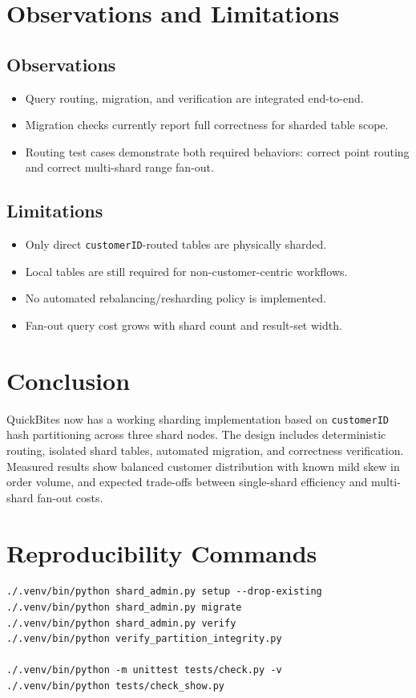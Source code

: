 \documentclass[12pt,a4paper]{article}
\begin{document}
\section{Observations and Limitations}

\subsection{Observations}

\begin{itemize}[leftmargin=*]
  \item Query routing, migration, and verification are integrated end-to-end.
  \item Migration checks currently report full correctness for sharded table scope.
  \item Routing test cases demonstrate both required behaviors: correct point routing and
  correct multi-shard range fan-out.
\end{itemize}

\subsection{Limitations}

\begin{itemize}[leftmargin=*]
  \item Only direct \texttt{customerID}-routed tables are physically sharded.
  \item Local tables are still required for non-customer-centric workflows.
  \item No automated rebalancing/resharding policy is implemented.
  \item Fan-out query cost grows with shard count and result-set width.
\end{itemize}

\section{Conclusion}

QuickBites now has a working sharding implementation based on
\texttt{customerID} hash partitioning across three shard nodes.
The design includes deterministic routing, isolated shard tables,
automated migration, and correctness verification.
Measured results show balanced customer distribution with known
mild skew in order volume, and expected trade-offs between
single-shard efficiency and multi-shard fan-out costs.

\appendix
\section{Reproducibility Commands}

\begin{verbatim}
./.venv/bin/python shard_admin.py setup --drop-existing
./.venv/bin/python shard_admin.py migrate
./.venv/bin/python shard_admin.py verify
./.venv/bin/python verify_partition_integrity.py

./.venv/bin/python -m unittest tests/check.py -v
./.venv/bin/python tests/check_show.py
\end{verbatim}
\end{document}
